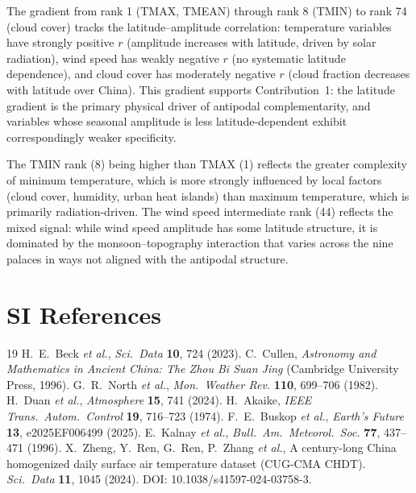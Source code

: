 \documentclass[10pt]{article}
\begin{document}
\vspace{6pt}
\noindent The gradient from rank 1 (TMAX, TMEAN) through rank 8 (TMIN) to rank 74 (cloud cover) tracks the latitude--amplitude correlation: temperature variables have strongly positive $r$ (amplitude increases with latitude, driven by solar radiation), wind speed has weakly negative $r$ (no systematic latitude dependence), and cloud cover has moderately negative $r$ (cloud fraction decreases with latitude over China). This gradient supports Contribution~1: the latitude gradient is the primary physical driver of antipodal complementarity, and variables whose seasonal amplitude is less latitude-dependent exhibit correspondingly weaker specificity.

The TMIN rank (8) being higher than TMAX (1) reflects the greater complexity of minimum temperature, which is more strongly influenced by local factors (cloud cover, humidity, urban heat islands) than maximum temperature, which is primarily radiation-driven. The wind speed intermediate rank (44) reflects the mixed signal: while wind speed amplitude has some latitude structure, it is dominated by the monsoon--topography interaction that varies across the nine palaces in ways not aligned with the antipodal structure.

\section*{SI References}

\begin{thebibliography}{19}
 H.~E.~Beck \textit{et al.}, \textit{Sci.~Data} \textbf{10}, 724 (2023).
 C.~Cullen, \textit{Astronomy and Mathematics in Ancient China: The Zhou Bi Suan Jing} (Cambridge University Press, 1996).
 G.~R.~North \textit{et al.}, \textit{Mon.~Weather Rev.} \textbf{110}, 699--706 (1982).
 H.~Duan \textit{et al.}, \textit{Atmosphere} \textbf{15}, 741 (2024).
 H.~Akaike, \textit{IEEE Trans.~Autom.~Control} \textbf{19}, 716--723 (1974).
 F.~E.~Buskop \textit{et al.}, \textit{Earth's Future} \textbf{13}, e2025EF006499 (2025).
 E.~Kalnay \textit{et al.}, \textit{Bull.~Am.~Meteorol.~Soc.} \textbf{77}, 437--471 (1996).
 X.~Zheng, Y.~Ren, G.~Ren, P.~Zhang \textit{et al.}, A century-long China homogenized daily surface air temperature dataset (CUG-CMA CHDT). \textit{Sci.~Data} \textbf{11}, 1045 (2024). DOI: 10.1038/s41597-024-03758-3.
\end{thebibliography}
\end{document}
